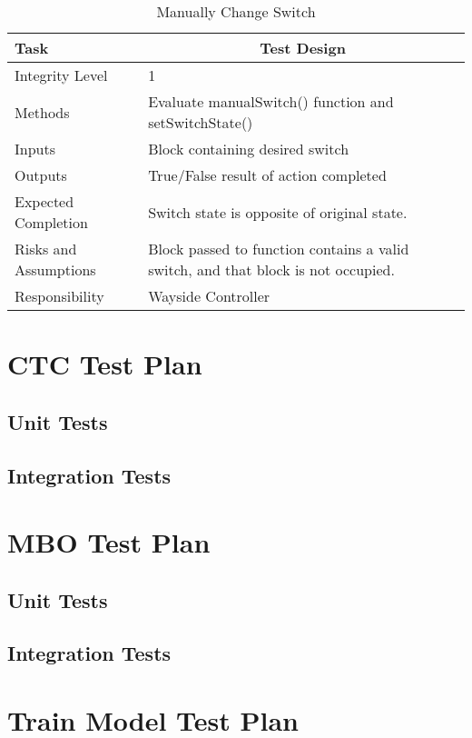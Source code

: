 \documentclass[]{article}
\begin{document}
	\begin{table}[H]
		\centering
		\caption{Manually Change Switch}
		\begin{tabular}{|l|l|}
			\hline
			Task & \multicolumn{1}{c|}{Test Design} \\ \hline
			Integrity Level & 1 \\ \hline
			Methods & Evaluate manualSwitch() function and setSwitchState()\\ \hline
			Inputs &  Block containing desired switch\\ \hline
			Outputs &  True/False result of action completed\\ \hline
			Expected Completion & Switch state is opposite of original state. \\ \hline
			Risks and Assumptions & \parbox[t]{10cm}{Block passed to function contains a valid switch, and that block is not occupied.} \\ \hline
			Responsibility & Wayside Controller\\ \hline
		\end{tabular}
	\end{table}

\section{CTC Test Plan}
\subsection{Unit Tests}
\subsection{Integration Tests}

\section{MBO Test Plan}
\subsection{Unit Tests}
\subsection{Integration Tests}

\section{Train Model Test Plan}
\end{document}
